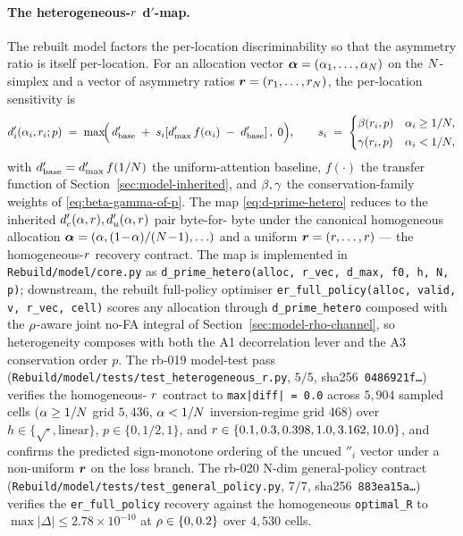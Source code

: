\paragraph{The heterogeneous-$r$ d$'$-map.}
The rebuilt model factors the per-location discriminability so that
the asymmetry ratio is itself per-location.  For an allocation vector
$\boldsymbol{\alpha} = (\alpha_1, \ldots, \alpha_{N})$ on the
$N$-simplex and a vector of asymmetry ratios
$\boldsymbol{r} = (r_1, \ldots, r_{N})$, the
per-location sensitivity is
%
\begin{equation}
  d'_i(\alpha_i, r_i; p)
  \;=\;
  \max\!\Bigl(\,
    d'_{\mathrm{base}}
    \;+\;
    s_i\!\left[d'_{\max}\,f(\alpha_i)
      \;-\;d'_{\mathrm{base}}\right],\;
    0\Bigr),
  \qquad
  s_i \;=\;
  \begin{cases}
    \beta(r_i, p) & \alpha_i \ge 1/N, \\[2pt]
    \gamma(r_i, p)    & \alpha_i < 1/N,
  \end{cases}
  \label{eq:d-prime-hetero}
\end{equation}
%
with $d'_{\mathrm{base}} = d'_{\max}\,f(1/N)$ the
uniform-attention baseline, $f(\cdot)$ the transfer function of
Section~\ref{sec:model-inherited}, and $\beta, \gamma$ the
conservation-family weights of \eqref{eq:beta-gamma-of-p}. The map
\eqref{eq:d-prime-hetero} reduces to the inherited
$d'_c(\alpha, r), d'_u(\alpha, r)$ pair byte-for-
byte under the canonical homogeneous allocation
$\boldsymbol{\alpha} = (\alpha, (1\!-\!\alpha)/(N\!-\!1), \ldots)$
and a uniform $\boldsymbol{r} = (r, \ldots, r)$ — the
homogeneous-$r$ recovery contract. The map is implemented in
\texttt{Rebuild/model/core.py} as \texttt{d\_prime\_hetero(alloc,
r\_vec, d\_max, f0, h, N, p)}; downstream, the rebuilt full-policy
optimiser \texttt{er\_full\_policy(alloc, valid, v, r\_vec, cell)}
scores any allocation through \texttt{d\_prime\_hetero} composed with
the $\rho$-aware joint no-FA integral of
Section~\ref{sec:model-rho-channel}, so heterogeneity composes with
both the A1 decorrelation lever and the A3 conservation order $p$.
The rb-019 model-test pass
(\texttt{Rebuild/model/tests/}\allowbreak\texttt{test\_heterogeneous\_r.py},
$5/5$, sha256~\texttt{0486921f\ldots}) verifies the homogeneous-
$r$ contract to \texttt{max|diff| = 0.0} across $5{,}904$
sampled cells ($\alpha \ge 1/N$ grid $5{,}436$, $\alpha < 1/N$
inversion-regime grid $468$) over $h \in \{\sqrt{\cdot}, \mathrm{linear}\}$,
$p \in \{0, 1/2, 1\}$, and $r \in \{0.1, 0.3, 0.398, 1.0, 3.162,
10.0\}$, and confirms the predicted sign-monotone ordering of the
uncued $\dprime_i$ vector under a non-uniform $\boldsymbol{r}$
on the loss branch. The rb-020 N-dim general-policy contract
(\texttt{Rebuild/model/tests/}\allowbreak\texttt{test\_general\_policy.py},
$7/7$, sha256~\texttt{883ea15a\ldots}) verifies the
\texttt{er\_full\_policy} recovery against the homogeneous
\texttt{optimal\_R} to $\max\!|\Delta| \le 2.78\!\times\!10^{-10}$ at
$\rho \in \{0, 0.2\}$ over $4{,}530$ cells.

